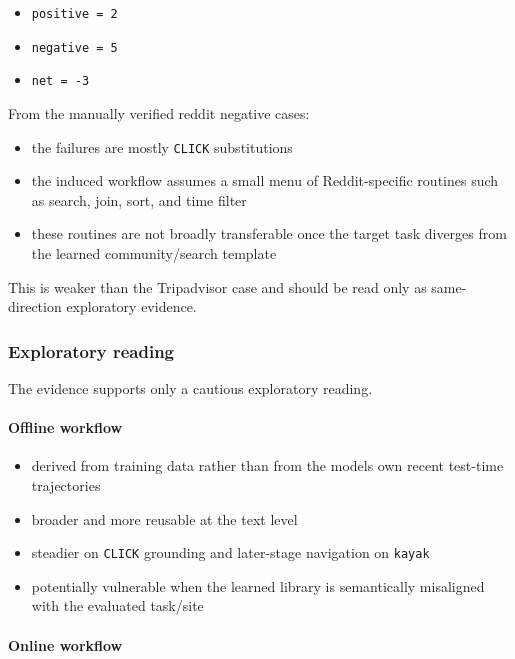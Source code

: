 \begin{itemize}
\tightlist
\item
  \texttt{positive\ =\ 2}
\item
  \texttt{negative\ =\ 5}
\item
  \texttt{net\ =\ -3}
\end{itemize}

From the manually verified reddit negative cases:

\begin{itemize}
\tightlist
\item
  the failures are mostly \texttt{CLICK} substitutions
\item
  the induced workflow assumes a small menu of Reddit-specific routines
  such as search, join, sort, and time filter
\item
  these routines are not broadly transferable once the target task
  diverges from the learned community/search template
\end{itemize}

This is weaker than the Tripadvisor case and should be read only as
same-direction exploratory evidence.

\subsubsection{Exploratory
reading}

The evidence supports only a cautious exploratory reading.

\paragraph{Offline workflow}

\begin{itemize}
\tightlist
\item
  derived from training data rather than from the
  model\textquotesingle s own recent test-time trajectories
\item
  broader and more reusable at the text level
\item
  steadier on \texttt{CLICK} grounding and later-stage navigation on
  \texttt{kayak}
\item
  potentially vulnerable when the learned library is semantically
  misaligned with the evaluated task/site
\end{itemize}

\paragraph{Online workflow}

